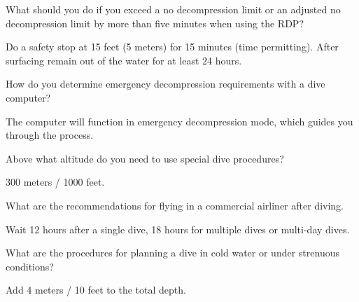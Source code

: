 	\begin{qanda}
		\begin{question}
What should you do if you exceed a no decompression limit or an adjusted no decompression limit by more than five minutes when using the RDP?
		\end{question}

		\begin{answer}
Do a safety stop at 15 feet (5 meters) for 15 minutes (time permitting).  After surfacing remain out of the water for at least 24 hours.
		\end{answer}
	\end{qanda}

	\begin{qanda}
		\begin{question}
How do you determine emergency decompression requirements with a dive computer?
		\end{question}

		\begin{answer}
The computer will function in emergency decompression mode, which guides you through the process.
		\end{answer}
	\end{qanda}

	\begin{qanda}
		\begin{question}
Above what altitude do you need to use special dive procedures?
		\end{question}

		\begin{answer}
300 meters / 1000 feet.
		\end{answer}
	\end{qanda}

	\begin{qanda}
		\begin{question}
What are the recommendations for flying in a commercial airliner after diving.
		\end{question}

		\begin{answer}
Wait 12 hours after a single dive, 18 hours for multiple dives or multi-day dives.
		\end{answer}
	\end{qanda}

	\begin{qanda}
		\begin{question}
What are the procedures for planning a dive in cold water or under strenuous conditions?
		\end{question}

		\begin{answer}
Add 4 meters / 10 feet to the total depth.
		\end{answer}
	\end{qanda}

